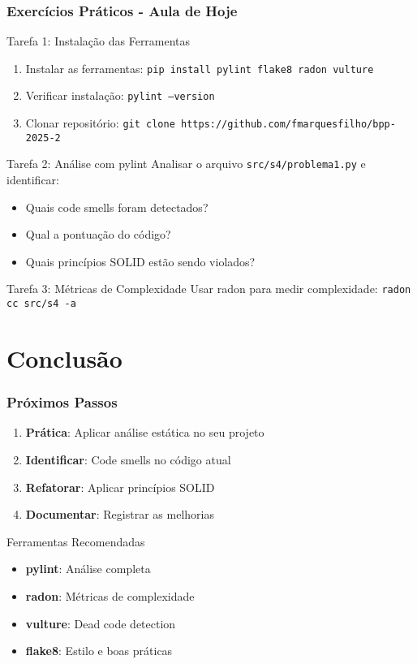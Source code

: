 \documentclass[aspectratio=169]{beamer}
\begin{document}
\begin{frame}
\frametitle{Exercícios Práticos - Aula de Hoje}
\begin{block}{Tarefa 1: Instalação das Ferramentas}
\footnotesize
\begin{enumerate}
    \item Instalar as ferramentas: \texttt{pip install pylint flake8 radon vulture}
    \item Verificar instalação: \texttt{pylint --version}
    \item Clonar repositório: \texttt{git clone https://github.com/fmarquesfilho/bpp-2025-2}
\end{enumerate}
\end{block}

\begin{block}{Tarefa 2: Análise com pylint}
\footnotesize
Analisar o arquivo \texttt{src/s4/problema1.py} e identificar:
\begin{itemize}
    \item Quais code smells foram detectados?
    \item Qual a pontuação do código?
    \item Quais princípios SOLID estão sendo violados?
\end{itemize}
\end{block}

\begin{block}{Tarefa 3: Métricas de Complexidade}
\footnotesize
Usar radon para medir complexidade: \texttt{radon cc src/s4 -a}
\end{block}
\end{frame}

\section{Conclusão}

\begin{frame}
\frametitle{Próximos Passos}
\begin{enumerate}
    \item \textbf{Prática}: Aplicar análise estática no seu projeto
    \item \textbf{Identificar}: Code smells no código atual
    \item \textbf{Refatorar}: Aplicar princípios SOLID
    \item \textbf{Documentar}: Registrar as melhorias
\end{enumerate}

\vspace{0.5cm}
\begin{block}{Ferramentas Recomendadas}
\footnotesize
\begin{itemize}
    \item \textbf{pylint}: Análise completa
    \item \textbf{radon}: Métricas de complexidade
    \item \textbf{vulture}: Dead code detection
    \item \textbf{flake8}: Estilo e boas práticas
\end{itemize}
\end{block}
\end{frame}
\end{document}
